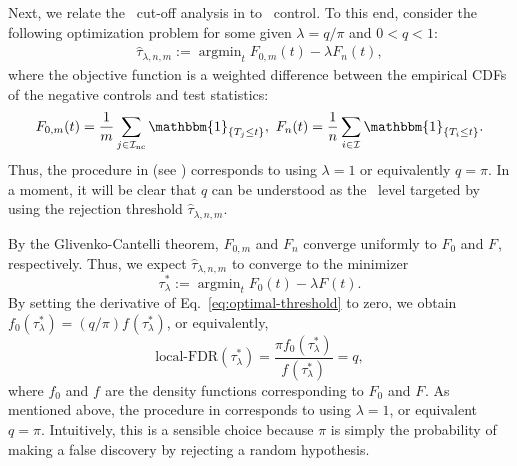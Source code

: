 \documentclass[a4paper,11pt]{article}
\theoremstyle{plain}
\theoremstyle{definition}
\def\calI{\mathcal{I}}
\def\1{\mathbbm{1}}
\newcommand{\argmin}{\mathop{\mathrm{argmin}}}
\theoremstyle{plain}
\newcommand{\No}{{n}}
\newcommand{\NoNc}{m}
\newcommand{\probNull}{{\pi}}
\newcommand{\testStatistics}[1]{{T_{#1}}}
\newcommand{\cdfTestStatistics}[1]{{F_{#1}}}
\newcommand{\cdfTestStatisticsNull}{{F_{0}}}
\newcommand{\pdfTestStatistics}[1]{{f_{#1}}}
\newcommand{\pdfTestStatisticsNull}{{f_{0}}}
\newcommand{\hypothesisIndex}[1]{{\calI_{#1}}}
\newcommand{\localFDR}{\text{local-FDR}}
\newcommand{\threshold}{{t}}
\newcommand{\EmpiricalThreshold}{{\hat{\tau}_{\lambda, \No, \NoNc}}}
\newcommand{\EmpiricalCdfTestStatistics}{{{F}_n}}
\newcommand{\EmpiricalCdfTestStatisticsNull}{{{F}_{0,\NoNc}}}
\newcommand{\cdfBased}{{\text{CDF-based}}}
\newcommand{\weightNull}{{w_0}}
\newcommand{\weightNonNull}{{w_1}}
\begin{document}
Next, we relate the \cdfBased\ cut-off analysis in
\textcite{hung14_proteom_mappin_human_mitoc_inter} to
\localFDR~control. To this end, consider the following optimization
problem for some given $\lambda = q / \probNull$ and $0 < q < 1$:
\begin{align}\label{eq:Bayes.risk.2}
 \EmpiricalThreshold := \argmin_{\threshold}
 \EmpiricalCdfTestStatisticsNull(\threshold) - \lambda
 \EmpiricalCdfTestStatistics(\threshold),
\end{align}
where the objective function is a weighted difference between the empirical CDFs
of the negative controls and test statistics:
\[
  \EmpiricalCdfTestStatisticsNull(t) = \frac{1}{\NoNc} \sum_{j \in
    \hypothesisIndex{\text{nc}}}  \1_{\{\testStatistics{j} \le t\}},~
  \EmpiricalCdfTestStatistics(t) = \frac{1}{\No} \sum_{i \in
    \hypothesisIndex{}}  \1_{\{\testStatistics{i} \le t\}}.
\]
Thus, the procedure in
\textcite{hung14_proteom_mappin_human_mitoc_inter} (see
) corresponds to using $\lambda=1$ or equivalently $q =
\pi$. In a moment, it will be clear that $q$ can be understood as the
\localFDR~level targeted by using the rejection threshold
$\EmpiricalThreshold$.

By the Glivenko-Cantelli theorem, $\EmpiricalCdfTestStatisticsNull$
and $\EmpiricalCdfTestStatistics$ converge uniformly
to $\cdfTestStatisticsNull{}$ and $\cdfTestStatistics{}$,
respectively. Thus, we expect $\EmpiricalThreshold$ to converge to the
minimizer
\begin{equation}
  \label{eq:optimal-threshold}
  \tau_{\lambda}^{*} := \argmin_\threshold
  \cdfTestStatisticsNull(\threshold) - \lambda
  \cdfTestStatistics{}(\threshold).
\end{equation}
By setting the derivative of Eq.~\eqref{eq:optimal-threshold} to zero, we
obtain $\pdfTestStatisticsNull(\tau_{\lambda}^{*}) = (q / \probNull)
\pdfTestStatistics{}(\tau_{\lambda}^{*})$, or equivalently,
\[
  \localFDR(\tau_{\lambda}^{*}) = \frac{\pi
    \pdfTestStatisticsNull(\tau_{\lambda}^{*})}{\pdfTestStatistics{}(\tau_{\lambda}^{*})}
  = q,
\]
where $\pdfTestStatisticsNull{}$ and $\pdfTestStatistics{}$ are the
density functions corresponding to $\cdfTestStatisticsNull{}$
and $\cdfTestStatistics{}$.
As mentioned above, the procedure in
\textcite{hung14_proteom_mappin_human_mitoc_inter} corresponds to
using $\lambda = 1$, or equivalent $q = \pi$. Intuitively, this is a
sensible choice because $\pi$ is simply the probability of making a
false discovery by rejecting a random hypothesis.
\end{document}
